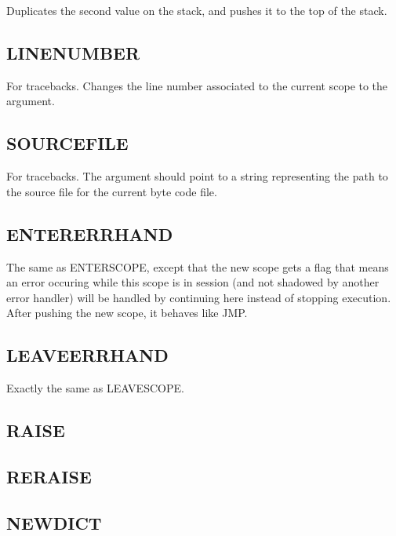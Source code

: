 Duplicates the second value on the stack, and pushes it to the top of
the stack.

\subsection{LINE\textunderscore{}NUMBER}
\label{sec:linenumber}

For tracebacks. Changes the line number associated to the current scope
to the argument.

\subsection{SOURCE\textunderscore{}FILE}
\label{sec:sourcefile}

For tracebacks. The argument should point to a string representing the
path to the source file for the current byte code file.

\subsection{ENTER\textunderscore{}ERRHAND}
\label{sec:entererrhand}

The same as ENTER\textunderscore{}SCOPE, except that the new scope gets
a flag that means an error occuring while this scope is in session (and
not shadowed by another error handler) will be handled by continuing
here instead of stopping execution. After pushing the new scope, it
behaves like JMP.

\subsection{LEAVE\textunderscore{}ERRHAND}
\label{sec:leaveerrhand}

Exactly the same as LEAVE\textunderscore{}SCOPE.

\subsection{RAISE}
\label{sec:raise}


\subsection{RERAISE}
\label{sec:reraise}


\subsection{NEW\textunderscore{}DICT}
\label{sec:newdict}


